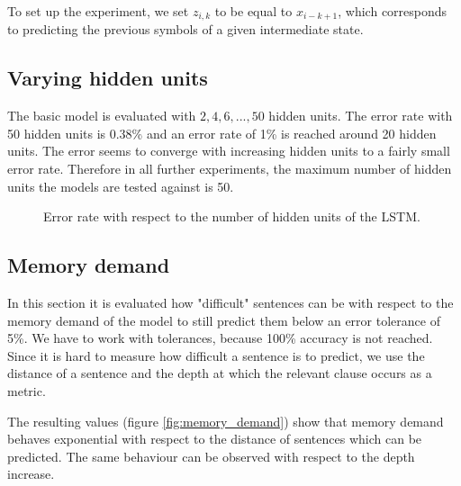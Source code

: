 \documentclass[11pt,a4paper]{article}
\newlength\figureheight
\newlength\figurewidth
\begin{document}
To set up the experiment, we set $z_{i,k}$ to be equal to $x_{i-k+1}$, which corresponds to predicting the previous symbols of a given intermediate state.

\subsection{Varying hidden units}
\label{subsec:varying_hidden_units}

The basic model is evaluated with $2,4,6,...,50$ hidden units. The error rate with 50 hidden units is 0.38\% and an error rate of 1\% is reached around 20 hidden units. The error seems to converge with increasing hidden units to a fairly small error rate. Therefore in all further experiments, the maximum number of hidden units the models are tested against is 50.

\setlength\figureheight{4cm}
\setlength\figurewidth{\linewidth}
\begin{figure}[ht]
    \caption{Error rate with respect to the number of hidden units of the LSTM.}%
    \label{fig:varying_units_results}%
\end{figure}

\subsection{Memory demand}
\label{subsec:memory_demand}

In this section it is evaluated how "difficult" sentences can be with respect to the memory demand of the model to still predict them below an error tolerance of 5\%. We have to work with tolerances, because 100\% accuracy is not reached. Since it is hard to measure how difficult a sentence is to predict, we use the distance of a sentence and the depth at which the relevant clause occurs as a metric.

\setlength\figureheight{5cm}
\setlength{}
\begin{figure*}[ht]
    \qquad
    
    \caption{Distances which can be predicted with a given number of hidden units and 5\% error tolerance. The dashed line is a logarithmic approximation}%
    \label{fig:memory_demand}%
\end{figure*}

The resulting values (figure \ref{fig:memory_demand}) show that memory demand behaves exponential with respect to the distance of sentences which can be predicted. The same behaviour can be observed with respect to the depth increase.
\end{document}
